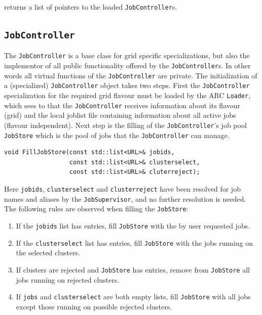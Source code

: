 \documentclass{book}
\newcommand{\JobController}{\texttt{JobController}}
\newcommand{\JobSupervisor}{\texttt{JobSupervisor}}
\newcommand{\Loader}{\texttt{Loader}}
\begin{document}
returns a list of pointers to the loaded {\JobController}s.

\subsection{{\JobController}}

The {\JobController} is a base class for grid specific
specializations, but also the implementor of all public functionality
offered by the {\JobController}s. In other words all virtual functions
of the {\JobController} are private. The initialization of a
(specialized) {\JobController} object takes two steps. First the
{\JobController} specialization for the required grid flavour must be
loaded by the ARC {\Loader}, which sees to that the {\JobController}
receives information about its flavour (grid) and the local joblist
file containing information about all active jobs (flavour
independent). Next step is the filling of the {\JobController}'s job
pool \texttt{JobStore} which is the pool of jobs that the
{\JobController} can manage.

\begin{shaded}
\begin{verbatim}
void FillJobStore(const std::list<URL>& jobids,
                  const std::list<URL>& clusterselect,
                  const std::list<URL>& cluterreject);
\end{verbatim}
\end{shaded}

Here \texttt{jobids}, \texttt{clusterselect} and
\texttt{clusterreject} have been resolved for job names and aliases by
the {\JobSupervisor}, and no further resolution is needed. The
following rules are observed when filling the \texttt{JobStore}:

\begin{enumerate}
\item{If the \texttt{jobids} list has entries, fill \texttt{JobStore}
  with the by user requested jobs.}
\item{If the \texttt{clusterselect} list has entries, fill
  \texttt{JobStore} with the jobs running on the selected clusters.}
\item{If clusters are rejected and \texttt{JobStore} has entries,
  remove from \texttt{JobStore} all jobs running on rejected
  clusters.}
\item{If \texttt{jobs} and \texttt{clusterselect} are both empty
  lists, fill \texttt{JobStore} with all jobs except those running on
  possible rejected clusters.}
\end{enumerate}
\end{document}
